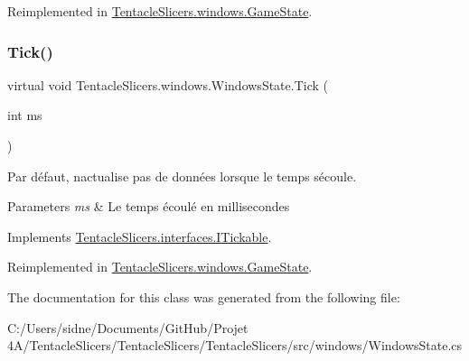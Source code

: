 Reimplemented in \hyperlink{class_tentacle_slicers_1_1windows_1_1_game_state_a3457252ae6d879e134167351a3b16445}{Tentacle\+Slicers.\+windows.\+Game\+State}.

\mbox{\label{class_tentacle_slicers_1_1windows_1_1_windows_state_a21040da05a02cf0bf9d8dfbdcbe5274d}} 
\subsubsection{\texorpdfstring{Tick()}{Tick()}}
{\footnotesize\ttfamily virtual void Tentacle\+Slicers.\+windows.\+Windows\+State.\+Tick (\begin{DoxyParamCaption}\item[{int}]{ms }\end{DoxyParamCaption})\hspace{0.3cm}{\ttfamily [virtual]}}



Par défaut, n\textquotesingle{}actualise pas de données lorsque le temps s\textquotesingle{}écoule. 


\begin{DoxyParams}{Parameters}
{\em ms} & Le temps écoulé en millisecondes \\
\hline
\end{DoxyParams}


Implements \hyperlink{interface_tentacle_slicers_1_1interfaces_1_1_i_tickable}{Tentacle\+Slicers.\+interfaces.\+I\+Tickable}.



Reimplemented in \hyperlink{class_tentacle_slicers_1_1windows_1_1_game_state_a395b822a8a2435ae6c3dfe22ce733f59}{Tentacle\+Slicers.\+windows.\+Game\+State}.



The documentation for this class was generated from the following file\+:\begin{DoxyCompactItemize}
\item 
C\+:/\+Users/sidne/\+Documents/\+Git\+Hub/\+Projet 4\+A/\+Tentacle\+Slicers/\+Tentacle\+Slicers/\+Tentacle\+Slicers/src/windows/Windows\+State.\+cs\end{DoxyCompactItemize}
